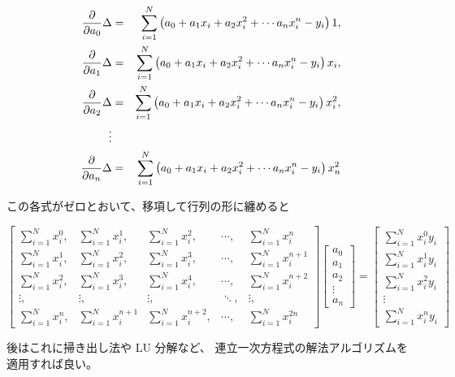 \documentclass[12pt]{jsarticle}
\def\sumdata{\sum_{i=1}^{N}}
\begin{document}
\begin{eqnarray}
  \partd{}{a_0} \Delta &=& \sumdata \left(
  a_0 + a_1 x_i + a_2 x_i^2 + \cdots a_n x_i^n  - y_i  \right) 1, \nonumber \\
  \partd{}{a_1} \Delta &=& \sumdata \left(
  a_0 + a_1 x_i + a_2 x_i^2 + \cdots a_n x_i^n  - y_i  \right) x_i, \nonumber \\
  \partd{}{a_2} \Delta &=& \sumdata \left(
  a_0 + a_1 x_i + a_2 x_i^2 + \cdots a_n x_i^n  - y_i  \right)
  x_i^2, \nonumber \\
  \vdots \nonumber \\
  \partd{}{a_n} \Delta &=& \sumdata \left(
  a_0 + a_1 x_i + a_2 x_i^2 + \cdots a_n x_i^n  - y_i  \right)
  x_n^2
\end{eqnarray}

この各式がゼロとおいて、移項して行列の形に纏めると

\begin{equation}
  \begin{bmatrix}
    \sumdata x_i^0, & \sumdata x_i^1, & \sumdata x_i^2,
    & \cdots, & \sumdata x_i^n \\
    \sumdata x_i^1, & \sumdata x_i^2, & \sumdata x_i^3,
    & \cdots, & \sumdata x_i^{n+1} \\
    \sumdata x_i^2, & \sumdata x_i^3, & \sumdata x_i^4,
    & \cdots, & \sumdata x_i^{n+2} \\
    \vdots, & \vdots, & \vdots, & \ddots, & \vdots, \\
    \sumdata x_i^n, & \sumdata x_i^{n+1} & \sumdata x_i^{n+2},
    & \cdots, & \sumdata x_i^{2n}
  \end{bmatrix}
  \begin{bmatrix}
    a_0 \\ a_1 \\ a_2 \\ \vdots \\ a_n
  \end{bmatrix}
  =
  \begin{bmatrix}
    \sumdata x_i^0 y_i \\
    \sumdata x_i^1 y_i \\
    \sumdata x_i^2 y_i \\
    \vdots \\
    \sumdata x_i^n y_i
  \end{bmatrix}
\end{equation}

後はこれに掃き出し法や LU 分解など、
連立一次方程式の解法アルゴリズムを適用すれば良い。
\end{document}

